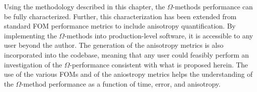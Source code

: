 Using the methodology described in this chapter, the $\Omega$-methods
performance can be fully characterized. Further, this characterization has been
extended from standard FOM performance metrics to include anisotropy
quantification.
By implementing the $\Omega$-methods into production-level software, it is
accessible to any user beyond the author. The generation of the anisotropy
metrics is also incorporated into the codebase, meaning that any user could
feasibly perform an investigation of the $\Omega$-performance consistent with
what is proposed herein. The use of the various FOMs and of the aniostropy
metrics helps the understanding of the $\Omega$-method performance as a function
of time, error, and anisotropy.

